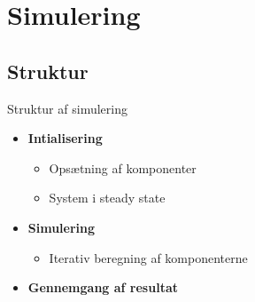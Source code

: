 	
\section{Simulering}
\subsection{Struktur}
\begin{frame}{Struktur af simulering}{}
\vfill\vfill\centering

\begin{itemize}
	\item<1-> \textbf{Intialisering}
	\vspace{3mm}
	\begin{itemize}
	\item<2-> Opsætning af komponenter
	\vspace{3mm}
	\item<3-> System i steady state
	\end{itemize}
	\vspace{3mm}
	\item<4-> \textbf{Simulering}
	\vspace{3mm}
	\begin{itemize}
	\item<5-> Iterativ beregning af komponenterne
	\end{itemize}
	\vspace{3mm}
	\item<6-> \textbf{Gennemgang af resultat}
\end{itemize}

\vfill\vfill		
\end{frame}


